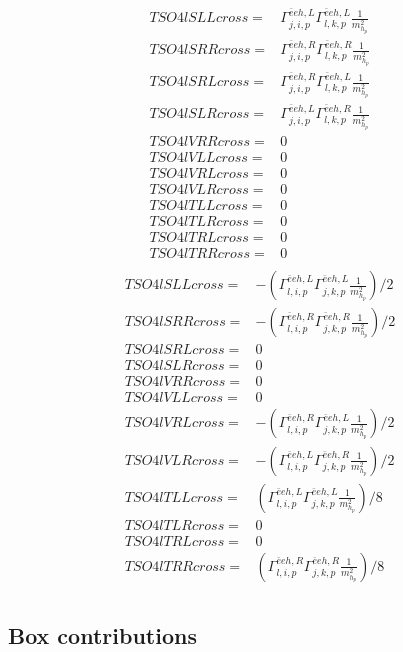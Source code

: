\documentclass[A4,landscape]{article}
\begin{document}
\begin{align} 
  TSO4lSLLcross= & \Gamma^{\bar{e}e h ,L}_{j, i, p} \Gamma^{\bar{e}e h ,L}_{l, k, p} \frac{1}{m^2_{h_{{p}}}} \\ 
  TSO4lSRRcross= & \Gamma^{\bar{e}e h ,R}_{j, i, p} \Gamma^{\bar{e}e h ,R}_{l, k, p} \frac{1}{m^2_{h_{{p}}}} \\ 
  TSO4lSRLcross= & \Gamma^{\bar{e}e h ,R}_{j, i, p} \Gamma^{\bar{e}e h ,L}_{l, k, p} \frac{1}{m^2_{h_{{p}}}} \\ 
  TSO4lSLRcross= & \Gamma^{\bar{e}e h ,L}_{j, i, p} \Gamma^{\bar{e}e h ,R}_{l, k, p} \frac{1}{m^2_{h_{{p}}}} \\ 
  TSO4lVRRcross= & 0 \\ 
  TSO4lVLLcross= & 0 \\ 
  TSO4lVRLcross= & 0 \\ 
  TSO4lVLRcross= & 0 \\ 
  TSO4lTLLcross= & 0 \\ 
  TSO4lTLRcross= & 0 \\ 
  TSO4lTRLcross= & 0 \\ 
  TSO4lTRRcross= & 0 \\ 
\end{align} 
\begin{align} 
  TSO4lSLLcross= & -(\Gamma^{\bar{e}e h ,L}_{l, i, p} \Gamma^{\bar{e}e h ,L}_{j, k, p} \frac{1}{m^2_{h_{{p}}}})/2 \\ 
  TSO4lSRRcross= & -(\Gamma^{\bar{e}e h ,R}_{l, i, p} \Gamma^{\bar{e}e h ,R}_{j, k, p} \frac{1}{m^2_{h_{{p}}}})/2 \\ 
  TSO4lSRLcross= & 0 \\ 
  TSO4lSLRcross= & 0 \\ 
  TSO4lVRRcross= & 0 \\ 
  TSO4lVLLcross= & 0 \\ 
  TSO4lVRLcross= & -(\Gamma^{\bar{e}e h ,R}_{l, i, p} \Gamma^{\bar{e}e h ,L}_{j, k, p} \frac{1}{m^2_{h_{{p}}}})/2 \\ 
  TSO4lVLRcross= & -(\Gamma^{\bar{e}e h ,L}_{l, i, p} \Gamma^{\bar{e}e h ,R}_{j, k, p} \frac{1}{m^2_{h_{{p}}}})/2 \\ 
  TSO4lTLLcross= & (\Gamma^{\bar{e}e h ,L}_{l, i, p} \Gamma^{\bar{e}e h ,L}_{j, k, p} \frac{1}{m^2_{h_{{p}}}})/8 \\ 
  TSO4lTLRcross= & 0 \\ 
  TSO4lTRLcross= & 0 \\ 
  TSO4lTRRcross= & (\Gamma^{\bar{e}e h ,R}_{l, i, p} \Gamma^{\bar{e}e h ,R}_{j, k, p} \frac{1}{m^2_{h_{{p}}}})/8 \\ 
\end{align} 
\subsection{Box contributions} 
\end{document}
